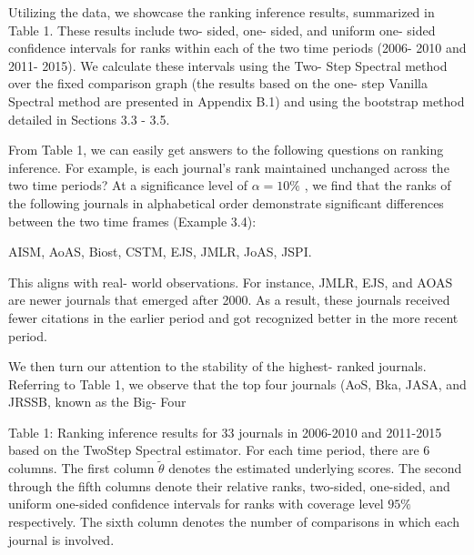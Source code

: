 Utilizing the data, we showcase the ranking inference results,
summarized in Table 1. These results include two- sided, one- sided, and
uniform one- sided confidence intervals for ranks within each of the two
time periods (2006- 2010 and 2011- 2015). We calculate these intervals
using the Two- Step Spectral method over the fixed comparison graph (the
results based on the one- step Vanilla Spectral method are presented in
Appendix B.1) and using the bootstrap method detailed in Sections 3.3 -
3.5.

From Table 1, we can easily get answers to the following questions on
ranking inference. For example, is each journal's rank maintained
unchanged across the two time periods? At a significance level of
\(\alpha = 10\%\) , we find that the ranks of the following journals in
alphabetical order demonstrate significant differences between the two
time frames (Example 3.4):

AISM, AoAS, Biost, CSTM, EJS, JMLR, JoAS, JSPI.

This aligns with real- world observations. For instance, JMLR, EJS, and
AOAS are newer journals that emerged after 2000. As a result, these
journals received fewer citations in the earlier period and got
recognized better in the more recent period.

We then turn our attention to the stability of the highest- ranked
journals. Referring to Table 1, we observe that the top four journals
(AoS, Bka, JASA, and JRSSB, known as the Big- Four

Table 1: Ranking inference results for 33 journals in 2006-2010 and
2011-2015 based on the TwoStep Spectral estimator. For each time period,
there are 6 columns. The first column \(\tilde{\theta}\) denotes the
estimated underlying scores. The second through the fifth columns denote
their relative ranks, two-sided, one-sided, and uniform one-sided
confidence intervals for ranks with coverage level \(95\%\)
respectively. The sixth column denotes the number of comparisons in
which each journal is involved.

